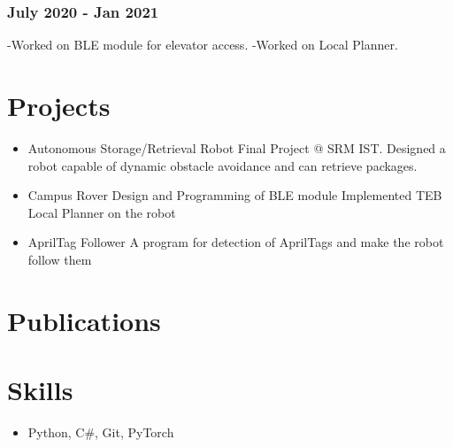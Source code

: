 \documentclass[11pt]{article}
\begin{document}
\subsubsection{July 2020 - Jan 2021}
\label{sec:orgbedd9bd}
-Worked on BLE module for elevator access.
-Worked on Local Planner.

\section{Projects}
\label{sec:orgb9dad44}
\begin{itemize}
\item Autonomous Storage/Retrieval Robot
Final Project @ SRM IST. Designed a robot
capable of dynamic obstacle avoidance and can
retrieve packages.

\item Campus Rover
Design and Programming of BLE module
Implemented TEB Local Planner on the robot

\item AprilTag Follower
A program for detection of AprilTags and make the robot follow
them
\end{itemize}

\section{Publications}
\label{sec:orgadd10cf}

\section{Skills}
\label{sec:orga5cff85}
\begin{itemize}
\item Python, C\#, Git, PyTorch
\end{itemize}
\end{document}
